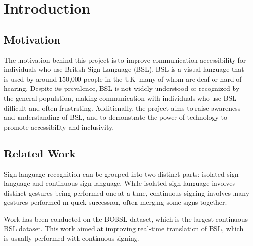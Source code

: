 \documentclass[final,dissertation.tex]{subfiles}
\begin{document}


\chapter{Introduction}

\section{Motivation}

The motivation behind this project is to improve communication accessibility for individuals who use British Sign Language (BSL). BSL is a visual language that is used by around 150,000 people in the UK, many of whom are deaf or hard of hearing. Despite its prevalence, BSL is not widely understood or recognized by the general population, making communication with individuals who use BSL difficult and often frustrating. Additionally, the project aims to raise awareness and understanding of BSL, and to demonstrate the power of technology to promote accessibility and inclusivity.

\section{Related Work}

Sign language recognition can be grouped into two distinct parts: isolated sign language and continuous sign language. While isolated sign language involves distinct gestures being performed one at a time, continuous signing involves many gestures performed in quick succession, often merging some signs together.

Work has been conducted on the BOBSL\cite{albanie2021bbc} dataset, which is the largest continuous BSL dataset. This work aimed at improving real-time translation of BSL, which is usually performed with continuous signing.
\end{document}
